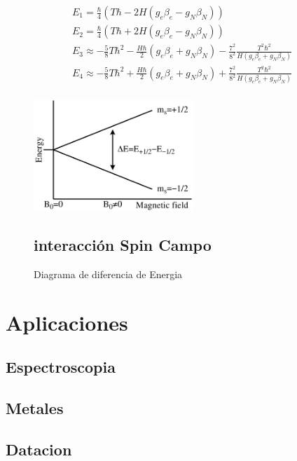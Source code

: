 \documentclass[%
amssymb,prb,aps,superscriptaddress]{revtex4}
\begin{document}
    \begin{align*}
        E_1 = \frac{\hbar}{4}(T \hbar - 2 H (g_e \beta_e - g_N \beta_N)) \\
        E_2 = \frac{\hbar}{4}(T \hbar + 2 H (g_e \beta_e - g_N \beta_N)) \\
        E_3 \approx -\frac{5}{8} T \hbar^2 - \frac{H \hbar}{2} (g_e \beta_e + g_N \beta_N) - \frac{7^2}{8^2} \frac{T^2 \hbar^2}{H(g_e \beta_e + g_N \beta_N)}\\
        E_4 \approx -\frac{5}{8} T \hbar^2 + \frac{H \hbar}{2} (g_e \beta_e + g_N \beta_N) + \frac{7^2}{8^2} \frac{T^2 \hbar^2}{H(g_e \beta_e + g_N \beta_N)} \\
    \end{align*}

    \begin{figure}[H]
        \centering
        \includegraphics[width=6.0cm]{images/EPR_splitting}
        \caption{Diagrama de diferencia de Energia}
        \label{fig:diagramaDiferenciaDeEnergia} \label{sec:momentosAngulares}

        \subsection{interacción Spin Campo}
    \end{figure}

\section{Aplicaciones}
\label{sec:aplicacion1}

\subsection{Espectroscopia}
\label{sec:aplicacion2}

\subsection{Metales}

\subsection{Datacion}
\end{document}
